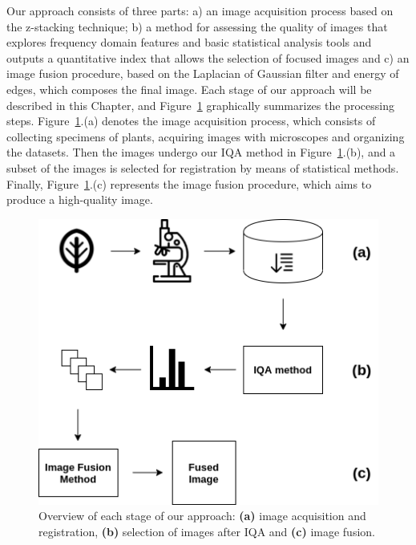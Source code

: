 Our approach consists of three parts: a) an image acquisition process based on the z-stacking technique; b) a method for assessing the quality of images that explores frequency domain features and basic statistical analysis tools and outputs a quantitative index that allows the selection of focused images and c) an image fusion procedure, based on the Laplacian of Gaussian filter and energy of edges, which composes the final image. Each stage of our approach will be described in this Chapter, and Figure~\ref{fig:overview} graphically summarizes the processing steps. Figure~\ref{fig:overview}.(a) denotes the image acquisition process, which consists of collecting specimens of plants, acquiring images with microscopes and organizing the datasets. Then the images undergo our IQA method in Figure~\ref{fig:overview}.(b), and a subset of the images is selected for registration by means of statistical methods. Finally, Figure~\ref{fig:overview}.(c) represents the image fusion procedure, which aims to produce a high-quality image.

\begin{figure}[ht]
  \centering
  \caption{Overview of each stage of our approach: \textbf{(a)} image acquisition and registration, \textbf{(b)} selection of images after IQA and \textbf{(c)} image fusion.}
  \label{fig:overview}
  \includegraphics[scale=0.8]{images/overview.png}
  \centering
  \fautor
\end{figure}